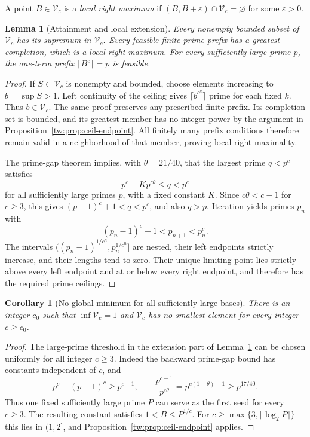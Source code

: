 \documentclass[11pt,a4paper]{article}
\newtheorem{lemma}[theorem]{Lemma}
\newtheorem{corollary}[theorem]{Corollary}
\theoremstyle{definition}
\theoremstyle{remark}
\numberwithin{equation}{section}
\begin{document}
A point $B\in\mathcal V_c$ is a \emph{local right maximum} if
$(B,B+\varepsilon)\cap\mathcal V_c=\varnothing$ for some $\varepsilon>0$.

\begin{lemma}[Attainment and local extension]\label{tw:lem:ceil-right}
Every nonempty bounded subset of $\mathcal V_c$ has its supremum in
$\mathcal V_c$. Every feasible finite prime prefix has a greatest
completion, which is a local right maximum. For every sufficiently large
prime $p$, the one-term prefix $\lceil B^c\rceil=p$ is feasible.
\end{lemma}

\begin{proof}
If $S\subset\mathcal V_c$ is nonempty and bounded, choose elements
increasing to $b=\sup S>1$. Left continuity of the ceiling gives
$\lceil b^{c^k}\rceil$ prime for each fixed $k$. Thus $b\in\mathcal V_c$.
The same proof preserves any prescribed finite prefix. Its completion
set is bounded, and its greatest member has no integer power by the
argument in Proposition~\ref{tw:prop:ceil-endpoint}. All finitely many
prefix conditions therefore remain valid in a neighborhood of that
member, proving local right maximality.

The prime-gap theorem implies, with $\theta=21/40$, that the largest
prime $q<p^c$ satisfies
\[
 p^c-Kp^{c\theta}\leq q<p^c
\]
for all sufficiently large primes $p$, with a fixed constant $K$.
Since $c\theta<c-1$ for $c\geq3$, this gives
$(p-1)^c+1<q<p^c$, and also $q>p$. Iteration yields primes $p_n$ with
\[
 (p_n-1)^c+1<p_{n+1}<p_n^c.
\]
The intervals $((p_n-1)^{1/c^n},p_n^{1/c^n}]$ are nested, their
left endpoints strictly increase, and their lengths tend to zero.
Their unique limiting point lies strictly above every left endpoint
and at or below every right endpoint, and therefore has the required
prime ceilings.
\end{proof}

\begin{corollary}[No global minimum for all sufficiently large bases]
There is an integer $c_0$ such that $\inf\mathcal V_c=1$ and
$\mathcal V_c$ has no smallest element for every integer $c\geq c_0$.
\end{corollary}

\begin{proof}
The large-prime threshold in the extension part of
Lemma~\ref{tw:lem:ceil-right} can be chosen uniformly for all integer
$c\geq3$. Indeed the backward prime-gap bound has constants independent
of $c$, and
\[
 p^c-(p-1)^c\geq p^{c-1},\qquad
 \frac{p^{c-1}}{p^{c\theta}}=p^{c(1-\theta)-1}
 \geq p^{17/40}.
\]
Thus one fixed sufficiently large prime $P$ can serve as the first seed
for every $c\geq3$. The resulting constant satisfies $1<B\leq P^{1/c}$.
For $c\geq\max\{3,\lceil\log_2 P\rceil\}$ this lies in $(1,2]$,
and Proposition~\ref{tw:prop:ceil-endpoint} applies.
\end{proof}
\end{document}
